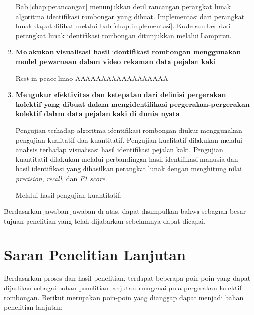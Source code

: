 \begin{enumerate}
    Bab \ref{chap:perancangan} menunjukkan detil rancangan perangkat lunak algoritma identifikasi rombongan yang dibuat. Implementasi dari perangkat lunak dapat dilihat melalui bab \ref{chap:implementasi}. Kode sumber dari perangkat lunak identifikasi rombongan ditunjukkan melalui Lampiran.
    
    \item \textbf{Melakukan visualisasi hasil identifikasi rombongan menggunakan model pewarnaan dalam video rekaman data pejalan kaki}
    
    Rest in peace lmao AAAAAAAAAAAAAAAAAA
    
    \item \textbf{Mengukur efektivitas dan ketepatan dari definisi pergerakan kolektif yang dibuat dalam mengidentifikasi pergerakan-pergerakan kolektif dalam data pejalan kaki di dunia nyata}
    
    Pengujian terhadap algoritma identifikasi rombongan diukur menggunakan pengujian kualitatif dan kuantitatif. Pengujian kualitatif dilakukan melalui analisis terhadap visualisasi hasil identifikasi pejalan kaki. Pengujian kuantitatif dilakukan melalui perbandingan hasil identifikasi manusia dan hasil identifikasi yang dihasilkan perangkat lunak dengan menghitung nilai \textit{precision}, \textit{recall}, dan \textit{F1 score}.
    
    Melalui hasil pengujian kuantitatif, 
\end{enumerate}

Berdasarkan jawaban-jawaban di atas, dapat disimpulkan bahwa sebagian besar tujuan penelitian yang telah dijabarkan sebelumnya dapat dicapai.

\section{Saran Penelitian Lanjutan}
\label{sec:saran}

Berdasarkan proses dan hasil penelitian, terdapat beberapa poin-poin yang dapat dijadikan sebagai bahan penelitian lanjutan mengenai pola pergerakan kolektif rombongan. Berikut merupakan poin-poin yang dianggap dapat menjadi bahan penelitian lanjutan:

